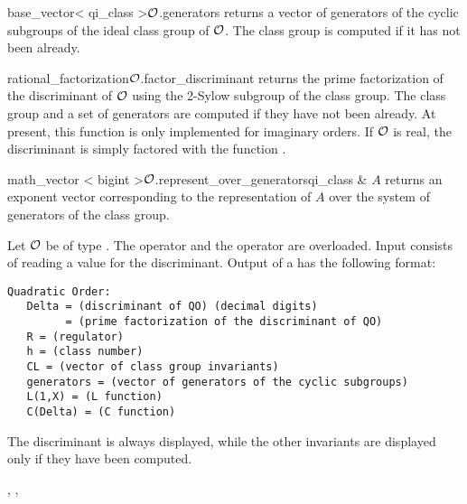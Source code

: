 \begin{fcode}{base_vector< qi_class >}{$\mathcal{O}$.generators}{}
  returns a vector of generators of the cyclic subgroups of the ideal class group of $\mathcal{O}$.  The
  class group is computed if it has not been already.
\end{fcode}

\begin{fcode}{rational_factorization}{$\mathcal{O}$.factor_discriminant}{}
  returns the prime factorization of the discriminant of $\mathcal{O}$ using the 2-Sylow subgroup of the
  class group.  The class group and a set of generators are computed if they have not been
  already.  At present, this function is only implemented for imaginary orders.  If $\mathcal{O}$ is
  real, the discriminant is simply factored with the  function
  .
\end{fcode}

\begin{fcode}{math_vector < bigint >}{$\mathcal{O}$.represent_over_generators}{qi_class & $A$}
  returns an exponent vector corresponding to the representation of $A$ over the system of
  generators of the class group.
\end{fcode}



\IO

Let $\mathcal{O}$ be of type .  The  operator \code{>>} and the
 operator \code{<<} are overloaded.  Input consists of reading a 
value for the discriminant.  Output of a  has the following format:

\begin{verbatim}
Quadratic Order:
   Delta = (discriminant of QO) (decimal digits)
         = (prime factorization of the discriminant of QO)
   R = (regulator)
   h = (class number)
   CL = (vector of class group invariants)
   generators = (vector of generators of the cyclic subgroups)
   L(1,X) = (L function)
   C(Delta) = (C function)
\end{verbatim}

The discriminant is always displayed, while the other invariants are displayed only if they have
been computed.



\SEEALSO

,
,



